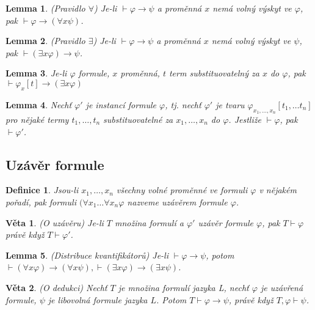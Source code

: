 \documentclass[a4paper, 11pt]{report}
\newtheorem{mydef}{Definice}[chapter]
\newtheorem{veta}{Věta}[chapter]
\newtheorem{lemma}{Lemma}[chapter]
\begin{document}
\begin{lemma}
(Pravidlo $\forall$) Je-li $\vdash \varphi \to \psi$ a proměnná $x$ nemá volný výskyt ve $\varphi$, pak $\vdash \varphi \to (\forall x \psi)$.
\end{lemma}

\begin{lemma}
(Pravidlo $\exists$) Je-li $\vdash \varphi \to \psi$ a proměnná $x$ nemá volný výskyt ve $\psi$, pak $\vdash (\exists x \varphi) \to \psi$.
\end{lemma}

\begin{lemma}
Je-li $\varphi$ formule, $x$ proměnná, $t$ term substituovatelný za $x$ do $\varphi$, pak $\vdash \varphi_x[t] \to (\exists x \varphi)$
\end{lemma}

\begin{lemma}
Nechť $\varphi'$ je instancí formule $\varphi$, tj. nechť $\varphi'$ je tvaru $\varphi_{x_1, \dots, x_n}[t_1, \dots t_n]$ pro nějaké termy $t_1, \dots, t_n$ substituovatelné za $x_1, \dots, x_n$ do $\varphi$. Jestliže $\vdash \varphi$, pak $\vdash \varphi'$.
\end{lemma}

\subsection{Uzávěr formule}
\begin{mydef}
Jsou-li $x_1, \dots, x_n$ všechny volné proměnné ve formuli $\varphi$ v nějakém pořadí, pak formuli $(\forall x_1 \dots \forall x_n \varphi$ nazveme uzávěrem formule $\varphi$.
\end{mydef}

\begin{veta}
(O uzávěru) Je-li $T$ množina formulí a $\varphi'$ uzávěr formule $\varphi$, pak $T \vdash \varphi$ právě když $T \vdash \varphi'$.
\end{veta}

\begin{lemma}
(Distribuce kvantifikátorů) Je-li $\vdash \varphi \to \psi$, potom $\vdash (\forall x \varphi ) \to (\forall x \psi), \vdash (\exists x \varphi) \to (\exists x \psi)$.
\end{lemma}

\begin{veta}
(O dedukci) Nechť $T$ je množina formulí jazyka L, nechť $\varphi$ je uzávřená formule, $\psi$ je libovolná formule jazyka $L$. Potom $T \vdash \varphi \to \psi$, právě když $T, \varphi \vdash \psi$.
\end{veta}
\end{document}
